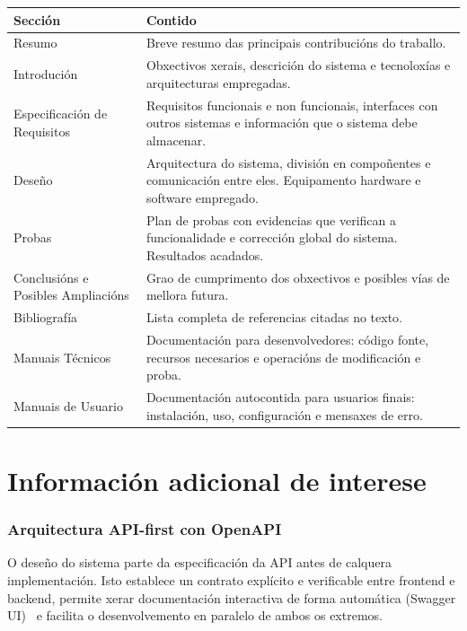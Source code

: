 \vspace{0.5em}
\begin{tabularx}{\textwidth}{@{}lX@{}}
  \toprule
  \textbf{Sección} & \textbf{Contido} \\
  \midrule
  Resumo                            & Breve resumo das principais contribucións do traballo. \\[4pt]
  Introdución                       & Obxectivos xerais, descrición do sistema e tecnoloxías e arquitecturas empregadas. \\[4pt]
  Especificación de Requisitos      & Requisitos funcionais e non funcionais, interfaces con outros sistemas e información que o sistema debe almacenar. \\[4pt]
  Deseño                            & Arquitectura do sistema, división en compoñentes e comunicación entre eles. Equipamento hardware e software empregado. \\[4pt]
  Probas                            & Plan de probas con evidencias que verifican a funcionalidade e corrección global do sistema. Resultados acadados. \\[4pt]
  Conclusións e Posibles Ampliacións & Grao de cumprimento dos obxectivos e posibles vías de mellora futura. \\[4pt]
  Bibliografía                      & Lista completa de referencias citadas no texto. \\[4pt]
  Manuais Técnicos                  & Documentación para desenvolvedores: código fonte, recursos necesarios e operacións de modificación e proba. \\[4pt]
  Manuais de Usuario                & Documentación autocontida para usuarios finais: instalación, uso, configuración e mensaxes de erro. \\
  \bottomrule
\end{tabularx}

\section{Información adicional de interese}

\subsubsection*{Arquitectura API-first con OpenAPI}

O deseño do sistema parte da especificación da API antes de calquera implementación.
Isto establece un contrato explícito e verificable entre frontend e backend, permite
xerar documentación interactiva de forma automática (Swagger UI)~\cite{openapi} e facilita o
desenvolvemento en paralelo de ambos os extremos.

